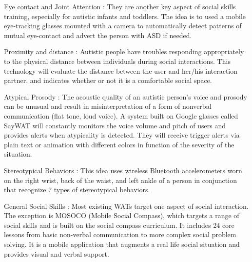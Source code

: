 Eye contact and Joint Attention : They are another key aspect of social skills training, especially for autistic infants and toddlers. The idea is to used a mobile eye-tracking glasses mounted with a camera to automatically detect patterns of mutual eye-contact and advert the person with ASD if needed.

Proximity and distance : Autistic people have troubles responding appropriately to the physical distance between individuals during social interactions. This technology will evaluate the distance between the user and her/his interaction partner, and indicates whether or not it is a comfortable social space. 

 Atypical Prosody : The acoustic quality of an autistic person’s voice and prosody can be unusual and result in misinterpretation of a form of nonverbal communication (flat tone, loud voice). A system built on Google glasses called SayWAT will constantly monitors the voice volume and pitch of users and provides alerts when atypicality is detected. They  will receive trigger alerts via plain text or animation with different colors in function of the severity of the situation.
 
Stereotypical Behaviors : This idea uses wireless Bluetooth accelerometers worn on the right wrist, back of the waist, and left ankle of a person in conjunction that recognize 7 types of stereotypical behaviors. 

General Social Skills : Most existing WATs target one aspect of social interaction. The exception is MOSOCO (Mobile Social Compass), which targets a range of social skills and is built on the social compass curriculum. It includes 24 core lessons from basic non-verbal communication to more complex social problem solving. It is a mobile application that augments a real life social situation and provides visual and verbal support.
